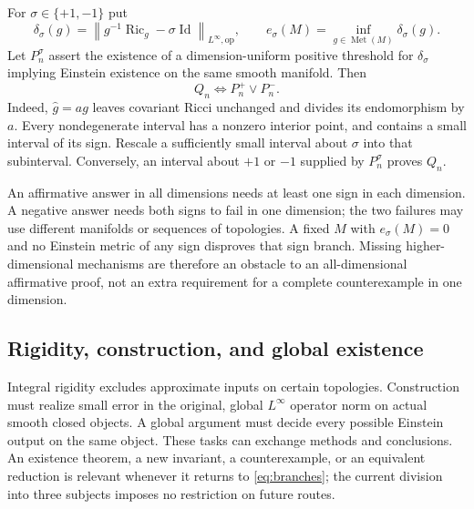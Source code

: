 \documentclass[11pt,a4paper]{article}
\theoremstyle{definition}
\theoremstyle{remark}
\DeclareMathOperator{\Ric}{Ric}
\DeclareMathOperator{\Id}{Id}
\DeclareMathOperator{\Met}{Met}
\newcommand{\norm}[1]{\left\|#1\right\|}
\newcommand{\op}{\mathrm{op}}
\numberwithin{equation}{section}
\begin{document}
For $\sigma\in\{+1,-1\}$ put
\[
 \delta_\sigma(g)=\norm{g^{-1}\Ric_g-\sigma\Id}_{L^\infty,\op},
 \qquad e_\sigma(M)=\inf_{g\in\Met(M)}\delta_\sigma(g).
\]
Let $P_n^\sigma$ assert the existence of a dimension-uniform positive
threshold for $\delta_\sigma$ implying Einstein existence on the same
smooth manifold. Then
\begin{equation}\label{eq:branches}
                         Q_n\iff P_n^+\lor P_n^-.
\end{equation}
Indeed, $\widehat g=ag$ leaves covariant Ricci unchanged and divides its
endomorphism by $a$. Every nondegenerate interval has a nonzero interior
point, and contains a small interval of its sign. Rescale a sufficiently
small interval about $\sigma$ into that subinterval. Conversely, an
interval about $+1$ or $-1$ supplied by $P_n^\sigma$ proves $Q_n$.

An affirmative answer in all dimensions needs at least one sign in each
dimension. A negative answer needs both signs to fail in one dimension;
the two failures may use different manifolds or sequences of topologies.
A fixed $M$ with $e_\sigma(M)=0$ and no Einstein metric of any sign
disproves that sign branch. Missing higher-dimensional mechanisms are
therefore an obstacle to an all-dimensional affirmative proof, not an
extra requirement for a complete counterexample in one dimension.

\subsection{Rigidity, construction, and global existence}\label{sub:research-roles}
Integral rigidity excludes approximate inputs on certain topologies.
Construction must realize small error in the original, global
$L^\infty$ operator norm on actual smooth closed objects. A global
argument must decide every possible Einstein output on the same object.
These tasks can exchange methods and conclusions. An existence theorem,
a new invariant, a counterexample, or an equivalent reduction is relevant
whenever it returns to \eqref{eq:branches}; the current division into
three subjects imposes no restriction on future routes.
\end{document}
